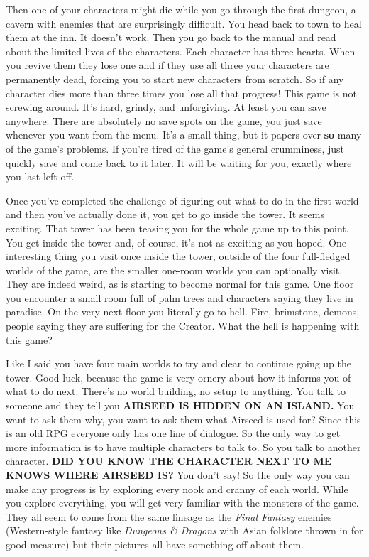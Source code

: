 \documentclass{book}
\begin{document}
Then one of your characters might die while you go through the first dungeon, a cavern with enemies that are surprisingly difficult. You head back to town to heal them at the inn. It doesn’t work. Then you go back to the manual and read about the limited lives of the characters. Each character has three hearts. When you revive them they lose one and if they use all three your characters are permanently dead, forcing you to start new characters from scratch. So if any character dies more than three times you lose all that progress! This game is not screwing around. It’s hard, grindy, and unforgiving. At least you can save anywhere. There are absolutely no save spots on the game, you just save whenever you want from the menu. It’s a small thing, but it papers over \textbf{so} many of the game’s problems. If you’re tired of the game’s general crumminess, just quickly save and come back to it later. It will be waiting for you, exactly where you last left off.

Once you’ve completed the challenge of figuring out what to do in the first world and then you’ve actually done it, you get to go inside the tower. It seems exciting. That tower has been teasing you for the whole game up to this point. You get inside the tower and, of course, it’s not as exciting as you hoped. One interesting thing you visit once inside the tower, outside of the four full-fledged worlds of the game, are the smaller one-room worlds you can optionally visit. They are indeed weird, as is starting to become normal for this game. One floor you encounter a small room full of palm trees and characters saying they live in paradise. On the very next floor you literally go to hell. Fire, brimstone, demons, people saying they are suffering for the Creator. What the hell is happening with this game?

Like I said you have four main worlds to try and clear to continue going up the tower. Good luck, because the game is very ornery about how it informs you of what to do next. There’s no world building, no setup to anything. You talk to someone and they tell you \textbf{AIRSEED IS HIDDEN ON AN ISLAND.} You want to ask them why, you want to ask them what Airseed is used for? Since this is an old RPG everyone only has one line of dialogue. So the only way to get more information is to have multiple characters to talk to. So you talk to another character. \textbf{DID YOU KNOW THE CHARACTER NEXT TO ME KNOWS WHERE AIRSEED IS?} You don’t say! So the only way you can make any progress is by exploring every nook and cranny of each world. While you explore everything, you will get very familiar with the monsters of the game. They all seem to come from the same lineage as the \emph{Final Fantasy} enemies (Western-style fantasy like \emph{Dungeons \& Dragons} with Asian folklore thrown in for good measure) but their pictures all have something off about them.
\end{document}
